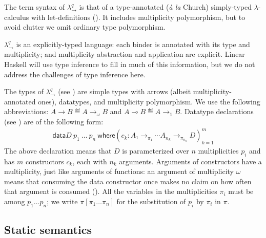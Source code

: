 \documentclass[acmsmall,screen]{acmart}\settopmatter{}
\newcommand{\case}[3][]{\mathsf{case}_{#1} #2 \mathsf{of} \{#3\}^m_{k=1}}
\newcommand{\data}{\mathsf{data} }
\newcommand\HaskeLL{Linear Haskell\xspace{}}
\newcommand\calc{{\ensuremath{λ^q_\to}}}
\begin{document}
The term syntax of \calc{} is that of a type-annotated (\textit{à la}
Church) simply-typed $λ$-calculus with let-definitions
().  It includes multiplicity polymorphism, but to avoid clutter
we omit ordinary type polymorphism.

\calc{} is an explicitly-typed language: each binder is annotated with
its type and multiplicity; and multiplicity abstraction and application
are explicit.  \HaskeLL{} will use type inference to fill in
much of this information, but we do not address the challenges of type
inference here.

The types of \calc{} (see ) are simple types with
arrows (albeit multiplicity-annotated ones), datatypes, and
multiplicity polymorphism.
We use the following abbreviations:
\(A → B ≝  A →_ω B\) and
\(A ⊸ B ≝ A →_1 B\).
%
Datatype declarations (see ) are of the following form:
\begin{align*}
  \data D~p_1~…~p_n~\mathsf{where} \left(c_k : A₁ →_{π₁} ⋯    A_{n_k} →_{π_{n_k}} D\right)^m_{k=1}
\end{align*}
The above declaration means that \(D\) is parameterized over \(n\) multiplicities $p_i$ and has \(m\) constructors \(c_k\),
each with \(n_k\) arguments. Arguments of
constructors have a multiplicity, just like arguments of functions: an
argument of multiplicity $ω$ means that consuming the data constructor once
makes no claim on how often that argument is consumed ().
All the variables in the multiplicities $π_i$ must be among
$p_1…p_n$; we write $π[π_1…π_n]$ for the substitution of $p_i$ by
$π_i$ in $π$.

\subsection{Static semantics}
\label{sec:typing-contexts}

\newcommand{\apprule}{\inferrule{Γ ⊢ t :  A →_π B  \\   Δ ⊢ u : A}{Γ+πΔ ⊢ t u  :  B}\text{app}}
\newcommand{\varrule}{\inferrule{ }{ωΓ + x :_1 A ⊢ x : A}\text{var}}
\newcommand{\caserule}{\inferrule{Γ   ⊢  t  : D~π_1~…~π_n \\ Δ, x₁:_{πμ_i[π_1…π_n]} A_i, …,
      x_{n_k}:_{πμ_{n_k}[π_1…π_n]} A_{n_k} ⊢ u_k : C \\
      \text{for each $c_k : A_1 →_{μ_1} … →_{μ_{n_k-1}} A_{n_k} →_{μ_{n_k}} D~p_1~…~p_n$}}
    {πΓ+Δ ⊢ \case[π] t {c_k  x₁ … x_{n_k} → u_k} : C}\text{case}}
\end{document}

